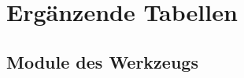 \chapter{Ergänzende Tabellen}
\label{app:tabellen}

\section{Module des Werkzeugs}
\label{app:module}
